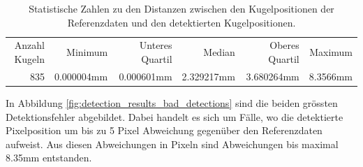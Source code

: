 \begin{table}[ht]
    \begin{tabular}{ rrrrrr }
        \rowcolor{\seccolor!50}
        Anzahl Kugeln & Minimum & Unteres Quartil & Median & Oberes Quartil & Maximum\\
        835 & 0.000004mm & 0.000601mm & 2.329217mm & 3.680264mm & 8.3566mm
    \end{tabular}
    \caption{Statistische Zahlen zu den Distanzen zwischen den Kugelpositionen der Referenzdaten und den detektierten Kugelpositionen.}
    \label{tab:detektion_resultate_distanzen_stats}
\end{table}


In Abbildung \ref{fig:detection_results_bad_detections} sind die beiden grössten Detektionsfehler abgebildet.
Dabei handelt es sich um Fälle, wo die detektierte Pixelposition um bis zu 5 Pixel Abweichung gegenüber den Referenzdaten aufweist.
Aus diesen Abweichungen in Pixeln sind Abweichungen bis maximal 8.35mm entstanden.

